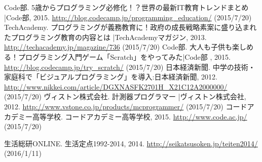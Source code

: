 \documentclass[openany,11pt,papersize]{jsbook}
\begin{document}

\begin{thebibliography}{9}
  Code部. 5歳からプログラミング必修化！？世界の最新IT教育トレンドまとめ |Code部,  2015. \url{http://blog.codecamp.jp/programming_education/} (2015/7/20)
  TechAcademy. プログラミングが義務教育に！政府の成長戦略素案に盛り込まれたプログラミング教育の内容とは |TechAcademyマガジン,  2013. \url{http://techacademy.jp/magazine/736} (2015/7/20)
   Code部. 大人も子供も楽しめる！プログラミング入門ゲーム「Scratch」をやってみた|Code部 ,  2015. \url{http://blog.codecamp.jp/try_scratch/} (2015/7/20)
  日本経済新聞. 中学の技術・家庭科で「ビジュアルプログラミング」を導入:日本経済新聞,  2012. \url{http://www.nikkei.com/article/DGXNASFK2701H_X21C12A2000000/} (2015/7/20)
  ヴィストン株式会社. 計測器プログラマー |ヴィストン株式会社,  2012. \url{http://www.vstone.co.jp/products/mcprogrammer/} (2015/7/20)
   コードアカデミー高等学校. コードアカデミー高等学校,  2015. \url{http://www.code.ac.jp/} (2015/7/20)

   生活総研ONLINE. 生活定点1992-2014,  2014. \url{http://seikatsusoken.jp/teiten2014/} (2016/1/11)

\end{thebibliography}
\end{document}

